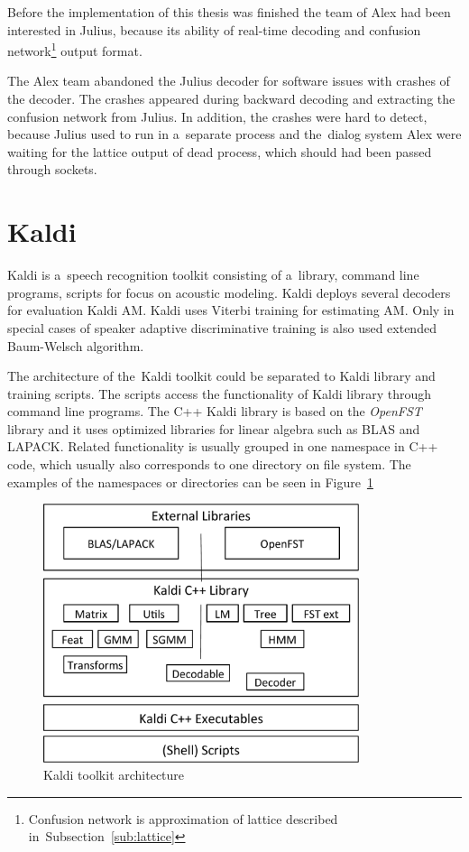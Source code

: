 Before the implementation of this thesis was finished 
the team of Alex had been interested in Julius, because its ability of real-time decoding 
and confusion 
network\footnote{Confusion network is approximation of lattice described in~Subsection~\ref{sub:lattice}} 
output format.

The Alex team abandoned the Julius decoder for software issues with crashes of the decoder. 
The crashes appeared during backward decoding and extracting
the confusion network from Julius. 
In addition, the crashes were hard to detect,
because Julius used to run in a~separate process and 
the~dialog system Alex were waiting for the lattice output of dead process,
which should had been passed through sockets.

\section{Kaldi}
\label{sec:back_kaldi}

Kaldi is a~speech recognition toolkit consisting of a~library, command line programs, scripts for focus on acoustic modeling.
Kaldi deploys several decoders for evaluation Kaldi \ac{AM}.
Kaldi uses Viterbi training for estimating \ac{AM}. 
Only in special cases of speaker adaptive discriminative training is also used extended Baum-Welsch algorithm\cite{povey2011kaldi}.

The architecture of the~Kaldi toolkit could be separated to Kaldi library and training scripts.
The scripts access the functionality of Kaldi library through command line programs.
The C++ Kaldi library is based on the {\it OpenFST}\cite{allauzen2007openfst} library and 
it uses optimized libraries for linear algebra such as BLAS and LAPACK.
Related functionality is usually grouped in one namespace in C++ code, which usually also corresponds
to one directory on file system. The examples of the namespaces or directories can be seen in Figure~\ref{fig:kaldi_arch}

\begin{figure}[!htp]
    \begin{center}
        \includegraphics[width=25em]{images/kaldi-lib}
        \caption{Kaldi toolkit architecture\cite{povey2011kaldi}}
        \label{fig:kaldi_arch} 
    \end{center}
\end{figure}

